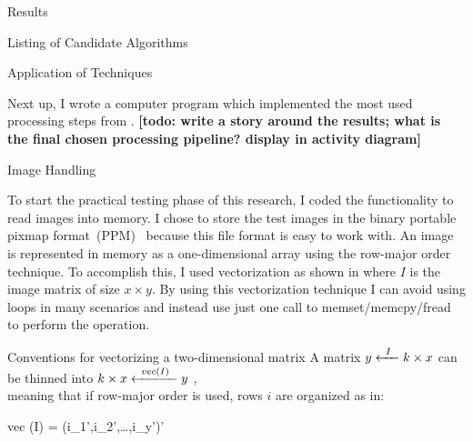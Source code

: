 \documentclass{matthijs}
\begin{document}
\begin{hoofdstuk}{Results}
\begin{paragraaf}{Listing of Candidate Algorithms}
		\end{paragraaf}

		\begin{paragraaf}{Application of Techniques}

			Next up, I wrote a computer program which implemented the most used processing steps from .
			\textbf{[todo: write a story around the results; what is the final chosen processing pipeline? display in activity diagram]}
	
			\begin{subparagraaf}{Image Handling}

				To start the practical testing phase of this research, I coded the functionality to read images into memory.
				I chose to store the test images in the binary portable pixmap \mbox{format (PPM) \cite{pawar2011implementation}} because this file format is easy to work with.
				An image is represented in memory as a one-dimensional array using the row-major order technique.
				To accomplish this, I used vectorization as shown in  where $I$ is the image matrix of size $x \times y$.
				By using this vectorization technique I can avoid using loops in many scenarios and instead use just one call to memset/memcpy/fread to perform the operation.

				\begin{figuur}{Conventions for vectorizing a two-dimensional matrix}
					\onehalfspacing
					A matrix $y \xleftarrow{\hspace{1ex}I\hspace{1ex}} k \times x$ can be thinned into $k \times x \xleftarrow{\hspace{1ex}vec(I)\hspace{1ex}} y$ \cite{macedo2013typing}, \\
					meaning that if row-major order is used, rows $i$ are organized as in:

					\vspace{-3ex}

					\begin{largequation}
						vec (I) = (i_1',i_2',\dots,i_y')'
					\end{largequation}

					\vspace{-1ex}%
					\cite{dhrymes2000mathematics}
				\end{figuur}


\end{subparagraaf}
\end{paragraaf}
\end{hoofdstuk}
\end{document}
